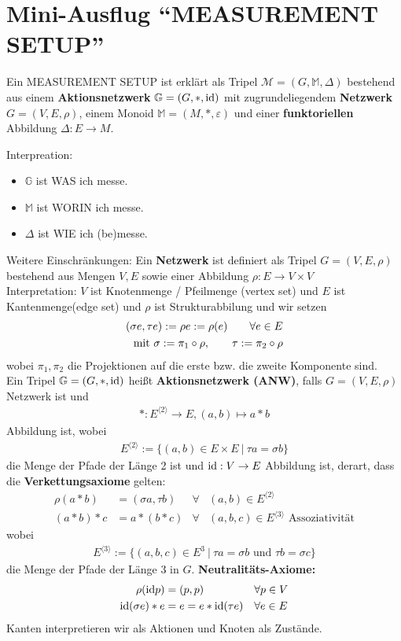 \section*{Mini-Ausflug ``MEASUREMENT SETUP''}
\begin{definition}
Ein MEASUREMENT SETUP ist erklärt als Tripel $\mathcal{M}=(G,\mathbb{M},\Delta)$ bestehend aus einem \textbf{Aktionsnetzwerk} $\mathbb{G}=(G,\ast,\id)$ mit zugrundeliegendem \textbf{Netzwerk} $G=(V,E,\rho)$, einem Monoid $\mathbb{M}=(M,\ast,\varepsilon)$ und einer \textbf{funktoriellen} Abbildung $\Delta:E\to M$.
\end{definition}
Interpreation:
\begin{itemize}
\item $\mathbb{G}$ ist WAS ich messe.
\item $\mathbb{M}$ ist WORIN ich messe.
\item $\Delta$ ist WIE ich (be)messe.
\end{itemize}
Weitere Einschränkungen: Ein \textbf{Netzwerk} ist definiert als Tripel $G=(V,E,\rho)$ bestehend aus Mengen $V,E$ sowie einer Abbildung $\rho:E\to V\times V$\\
Interpretation: $V$ ist Knotenmenge / Pfeilmenge (vertex set) und $E$ ist Kantenmenge(edge set) und $\rho$ ist Strukturabbilung und wir setzen
\begin{align*}
(\sigma e,\tau e):=\rho e:=\rho(e)\qquad\forall e\in E\\
\mit\sigma:=\pi_1\circ\rho,\qquad\tau:=\pi_2\circ\rho
\end{align*}
wobei $\pi_1,\pi_2$ die Projektionen auf die erste bzw. die zweite Komponente sind.\\
Ein Tripel $\mathbb{G}=(G,\ast,\id)$ heißt \textbf{Aktionsnetzwerk (ANW)}, falls $G=(V,E,\rho)$ Netzwerk ist und 
\begin{align*}
\ast:E^{\langle 2\rangle}\to E, (a,b)\mapsto a\ast b
\end{align*}
Abbildung ist, wobei
\begin{align*}
E^{\langle 2\rangle}:=\big\lbrace (a,b)\in E\times E~\big|~\tau a =\sigma b\big\rbrace
\end{align*}
die Menge der Pfade der Länge 2 ist und $\id:V\to E$ Abbildung ist, derart, dass die \textbf{Verkettungsaxiome} gelten:
\begin{align*}
\rho(a\ast b)&=(\sigma a,\tau b) &\forall& (a,b)\in E^{\langle 2\rangle}\\
(a\ast b)\ast c&=a\ast(b\ast c) &\forall& (a,b,c)\in E^{\langle 3\rangle}\text{ Assoziativität}
\end{align*}
wobei 
\begin{align*}
E^{\langle 3\rangle}:=\big\lbrace(a,b,c)\in E^3~\big|~\tau a=\sigma b\text{ und }\tau b=\sigma c\big\rbrace
\end{align*}
die Menge der Pfade der Länge 3 in $G$.
\textbf{Neutralitäts-Axiome:}
\begin{align*}
\rho (\id p)&=(p,p) &\forall& p\in V\\
\id(\sigma e)\ast e&=e=e\ast\id(\tau e) &\forall& e\in E
\end{align*}
Kanten interpretieren wir als Aktionen und Knoten als Zustände.

